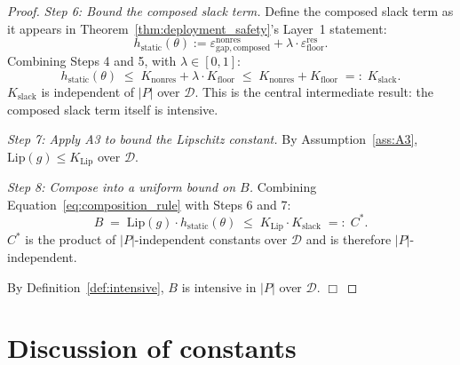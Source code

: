 \documentclass{article}
\newcommand{\epsfloor}{\varepsilon_{\mathrm{floor}}^{\mathrm{res}}}
\newcommand{\epsnonresComposed}{\varepsilon_{\mathrm{gap},\mathrm{composed}}^{\mathrm{nonres}}}
\begin{document}
\begin{proof}
\emph{Step 6: Bound the composed slack term.}
Define the composed slack term as it appears in
Theorem~\ref{thm:deployment_safety}'s Layer~1 statement:
\begin{equation}
\label{eq:hstatic_def}
  h_{\mathrm{static}}(\theta) := \epsnonresComposed + \lambda \cdot \epsfloor.
\end{equation}
Combining Steps 4 and 5, with $\lambda \in [0,1]$:
\begin{equation}
\label{eq:hstatic_bound}
  h_{\mathrm{static}}(\theta) \;\leq\; K_{\mathrm{nonres}} +
  \lambda \cdot K_{\mathrm{floor}}
  \;\leq\; K_{\mathrm{nonres}} + K_{\mathrm{floor}}
  \;=:\; K_{\mathrm{slack}}.
\end{equation}
$K_{\mathrm{slack}}$ is independent of $|P|$ over $\mathcal{D}$.
This is the central intermediate result: the composed slack term
itself is intensive.

\emph{Step 7: Apply A3 to bound the Lipschitz constant.}
By Assumption~\ref{ass:A3}, $\mathrm{Lip}(g) \leq K_{\mathrm{Lip}}$
over $\mathcal{D}$.

\emph{Step 8: Compose into a uniform bound on $B$.}
Combining Equation~\ref{eq:composition_rule} with Steps 6 and 7:
\begin{equation}
\label{eq:final_bound}
  B \;=\; \mathrm{Lip}(g) \cdot h_{\mathrm{static}}(\theta)
  \;\leq\; K_{\mathrm{Lip}} \cdot K_{\mathrm{slack}}
  \;=:\; C^*.
\end{equation}
$C^*$ is the product of $|P|$-independent constants over
$\mathcal{D}$ and is therefore $|P|$-independent.

By Definition~\ref{def:intensive}, $B$ is intensive in $|P|$ over
$\mathcal{D}$. $\Box$
\end{proof}

\section{Discussion of constants}
\end{document}
